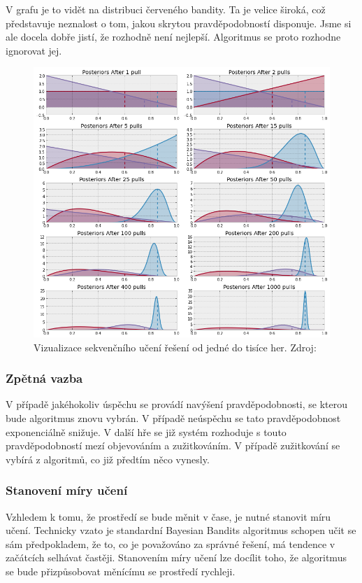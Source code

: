 \documentclass[thesis=M,czech]{FITthesis}[2014/05/07]
\begin{document}
V grafu je to vidět na distribuci červeného bandity. Ta je velice široká, což představuje neznalost o tom, jakou skrytou pravděpodobností disponuje. Jsme si ale docela dobře jistí, že rozhodně není nejlepší. Algoritmus se proto rozhodne ignorovat jej.

\begin{figure}\centering
	\includegraphics[width=1.0\textwidth]{obr/posteriors.png}
 	\caption[Vizualizace sekvenčního učení řešení od jedné do tisíce her.]{Vizualizace sekvenčního učení řešení od jedné do tisíce her. Zdroj: \cite{camdp}}\label{fig:posteriors}
\end{figure}	

\subsubsection{Zpětná vazba}
V případě jakéhokoliv úspěchu se provádí navýšení pravděpodobnosti, se kterou bude algoritmus znovu vybrán. V případě neúspěchu se tato pravděpodobnost exponenciálně snižuje. V další hře se již systém rozhoduje s touto pravděpodobností mezí objevováním a zužitkováním. V případě zužitkování se vybírá z algoritmů, co již předtím něco vynesly. 

\subsubsection{Stanovení míry učení}
Vzhledem k tomu, že prostředí se bude měnit v čase, je nutné stanovit míru učení. Technicky vzato je standardní Bayesian Bandits algoritmus schopen učit se sám předpokladem, že to, co je považováno za správné řešení, má tendence v začátcích selhávat častěji. Stanovením míry učení lze docílit toho, že algoritmus se bude přizpůsobovat měnícímu se prostředí rychleji.
\end{document}
